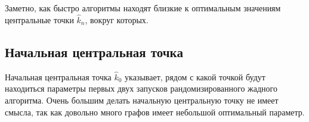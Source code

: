 Заметно, как быстро алгоритмы находят близкие к оптимальным значениям центральные точки $\hat{k}_n$, вокруг которых.



\subsection{Начальная центральная точка}

Начальная центральная точка $\hat{k}_0$ указывает, рядом с какой точкой будут находиться параметры первых двух запусков рандомизированного жадного алгоритма. Очень большим делать начальную центральную точку не имеет смысла, так как довольно много графов имеет небольшой оптимальный параметр.

